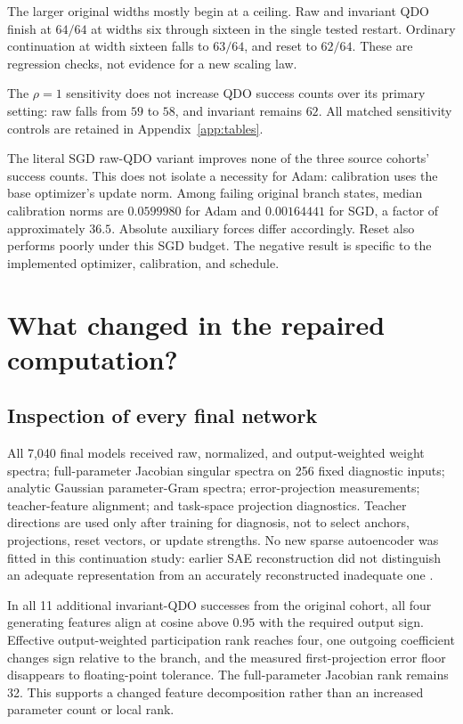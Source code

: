 \documentclass[11pt,letterpaper]{article}
\theoremstyle{remark}\newtheorem{remark}{Remark}
\begin{document}
The larger original widths mostly begin at a ceiling. Raw and invariant QDO finish at $64/64$ at widths six through sixteen in the single tested restart. Ordinary continuation at width sixteen falls to $63/64$, and reset to $62/64$. These are regression checks, not evidence for a new scaling law.

The $\rho=1$ sensitivity does not increase QDO success counts over its primary setting: raw falls from $59$ to $58$, and invariant remains $62$. All matched sensitivity controls are retained in Appendix~\ref{app:tables}.

The literal SGD raw-QDO variant improves none of the three source cohorts' success counts. This does not isolate a necessity for Adam: calibration uses the base optimizer's update norm. Among failing original branch states, median calibration norms are $0.0599980$ for Adam and $0.00164441$ for SGD, a factor of approximately $36.5$. Absolute auxiliary forces differ accordingly. Reset also performs poorly under this SGD budget. The negative result is specific to the implemented optimizer, calibration, and schedule.

\section{What changed in the repaired computation?}\label{sec:mechanism}
\subsection{Inspection of every final network}
All 7,040 final models received raw, normalized, and output-weighted weight spectra; full-parameter Jacobian singular spectra on 256 fixed diagnostic inputs; analytic Gaussian parameter-Gram spectra; error-projection measurements; teacher-feature alignment; and task-space projection diagnostics. Teacher directions are used only after training for diagnosis, not to select anchors, projections, reset vectors, or update strengths. No new sparse autoencoder was fitted in this continuation study: earlier SAE reconstruction did not distinguish an adequate representation from an accurately reconstructed inadequate one \cite{artifactAnatomy,artifactDirectional}.

In all 11 additional invariant-QDO successes from the original cohort, all four generating features align at cosine above $0.95$ with the required output sign. Effective output-weighted participation rank reaches four, one outgoing coefficient changes sign relative to the branch, and the measured first-projection error floor disappears to floating-point tolerance. The full-parameter Jacobian rank remains 32. This supports a changed feature decomposition rather than an increased parameter count or local rank.
\end{document}
